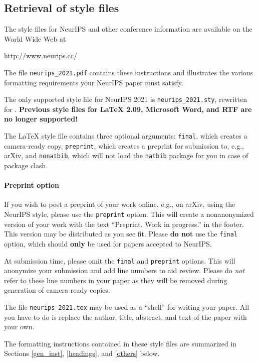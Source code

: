 \documentclass{article}
\begin{document}
	\subsection{Retrieval of style files}
	
	The style files for NeurIPS and other conference information are available on
	the World Wide Web at
	\begin{center}
		\url{http://www.neurips.cc/}
	\end{center}
	The file \verb+neurips_2021.pdf+ contains these instructions and illustrates the
	various formatting requirements your NeurIPS paper must satisfy.
	
	The only supported style file for NeurIPS 2021 is \verb+neurips_2021.sty+,
	rewritten for \LaTeXe{}.  \textbf{Previous style files for \LaTeX{} 2.09,
		Microsoft Word, and RTF are no longer supported!}
	
	The \LaTeX{} style file contains three optional arguments: \verb+final+, which
	creates a camera-ready copy, \verb+preprint+, which creates a preprint for
	submission to, e.g., arXiv, and \verb+nonatbib+, which will not load the
	\verb+natbib+ package for you in case of package clash.
	
	\paragraph{Preprint option}
	If you wish to post a preprint of your work online, e.g., on arXiv, using the
	NeurIPS style, please use the \verb+preprint+ option. This will create a
	nonanonymized version of your work with the text ``Preprint. Work in progress.''
	in the footer. This version may be distributed as you see fit. Please \textbf{do
		not} use the \verb+final+ option, which should \textbf{only} be used for
	papers accepted to NeurIPS.
	
	At submission time, please omit the \verb+final+ and \verb+preprint+
	options. This will anonymize your submission and add line numbers to aid
	review. Please do \emph{not} refer to these line numbers in your paper as they
	will be removed during generation of camera-ready copies.
	
	The file \verb+neurips_2021.tex+ may be used as a ``shell'' for writing your
	paper. All you have to do is replace the author, title, abstract, and text of
	the paper with your own.
	
	The formatting instructions contained in these style files are summarized in
	Sections \ref{gen_inst}, \ref{headings}, and \ref{others} below.
	
\end{document}
